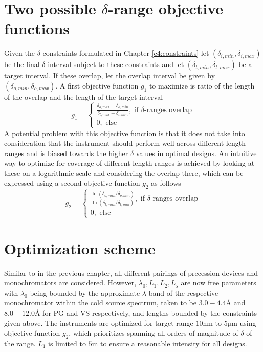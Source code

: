 \section{Two possible $\delta$-range objective functions}
\label{c5.2}
Given the $\delta$ constraints formulated in Chapter \ref{c4:constraints} let $(\delta_{i, min},\delta_{i, max})$ be the final $\delta$ interval subject to these constraints and let $(\delta_{t, min},\delta_{t, max})$ be a target interval. If these overlap, let the overlap interval be given by $(\delta_{o, min},\delta_{o, max})$. A first objective function $g_1$ to maximize is ratio of the length of the overlap and the length of the target interval
$$g_1 = \begin{cases}
	\frac{\delta_{o, max}-\delta_{o, min}}{\delta_{t, max} - \delta_{t, min}},\text{ if $\delta$-ranges overlap}\\
	0,\text{ else}
\end{cases}$$
A potential problem with this objective function is that it does not take into consideration that the instrument should perform well across different length ranges and is biased towards the higher $\delta$ values in optimal designs. An intuitive way to optimize for coverage of different length ranges is achieved by looking at these on a logarithmic scale and considering the overlap there, which can be expressed using a second objective function $g_2$ as follows 
$$g_2 = \begin{cases}
	\frac{\ln(\delta_{o, max}/\delta_{o, min})}{\ln(\delta_{t, max}/\delta_{t, min})},\text{ if $\delta$-ranges overlap}\\
	0,\text{ else}
\end{cases}$$

\section{Optimization scheme}
\label{c5.3}
Similar to in the previous chapter, all different pairings of precession devices and monochromators are considered. However, $\lambda_0, L_1, L_2, L_s$ are now free parameters with $\lambda_0$ being bounded by the approximate $\lambda$-band of the respective monochromator within the cold source spectrum, taken to be $3.0 - 4.4$Å and $8.0 - 12.0$Å for PG and VS respectively, and lengths bounded by the constraints given above. 
The instruments are optimized for target range $10 \unit{\nano\meter}$ to $5 \unit{\micro\meter}$ using objective function $g_2$, which prioritizes spanning all orders of magnitude of $\delta$ of the range. $L_1$ is limited to $5 \unit\meter$ to ensure a reasonable intensity for all designs. 


